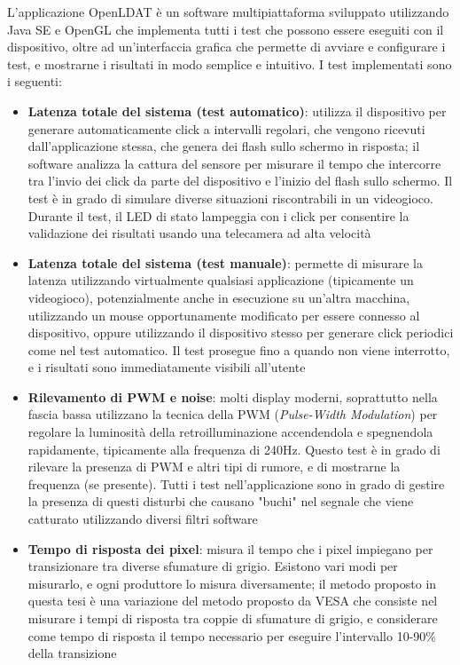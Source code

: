 \documentclass[a4paper]{article}
\begin{document}
L'applicazione OpenLDAT è un software multipiattaforma sviluppato utilizzando Java SE e OpenGL che implementa tutti i test che possono essere eseguiti con il dispositivo, oltre ad un'interfaccia grafica che permette di avviare e configurare i test, e mostrarne i risultati in modo semplice e intuitivo. I test implementati sono i seguenti:\begin{itemize}
	\item \textbf{Latenza totale del sistema (test automatico)}: utilizza il dispositivo per generare automaticamente click a intervalli regolari, che vengono ricevuti dall'applicazione stessa, che genera dei flash sullo schermo in risposta; il software analizza la cattura del sensore per misurare il tempo che intercorre tra l'invio dei click da parte del dispositivo e l'inizio del flash sullo schermo. Il test è in grado di simulare diverse situazioni riscontrabili in un videogioco. Durante il test, il LED di stato lampeggia con i click per consentire la validazione dei risultati usando una telecamera ad alta velocità
	\item \textbf{Latenza totale del sistema (test manuale)}: permette di misurare la latenza utilizzando virtualmente qualsiasi applicazione (tipicamente un videogioco), potenzialmente anche in esecuzione su un'altra macchina, utilizzando un mouse opportunamente modificato per essere connesso al dispositivo, oppure utilizzando il dispositivo stesso per generare click periodici come nel test automatico. Il test prosegue fino a quando non viene interrotto, e i risultati sono immediatamente visibili all'utente
	\item \textbf{Rilevamento di PWM e noise}: molti display moderni, soprattutto nella fascia bassa utilizzano la tecnica della PWM (\textit{Pulse-Width Modulation}) per regolare la luminosità della retroilluminazione accendendola e spegnendola rapidamente, tipicamente alla frequenza di 240Hz. Questo test è in grado di rilevare la presenza di PWM e altri tipi di rumore, e di mostrarne la frequenza (se presente). Tutti i test nell'applicazione sono in grado di gestire la presenza di questi disturbi che causano "buchi" nel segnale che viene catturato utilizzando diversi filtri software
	\item \textbf{Tempo di risposta dei pixel}: misura il tempo che i pixel impiegano per transizionare tra diverse sfumature di grigio. Esistono vari modi per misurarlo, e ogni produttore lo misura diversamente; il metodo proposto in questa tesi è una variazione del metodo proposto da VESA che consiste nel misurare i tempi di risposta tra coppie di sfumature di grigio, e considerare come tempo di risposta il tempo necessario per eseguire l'intervallo 10-90\% della transizione

\end{itemize}
\end{document}
